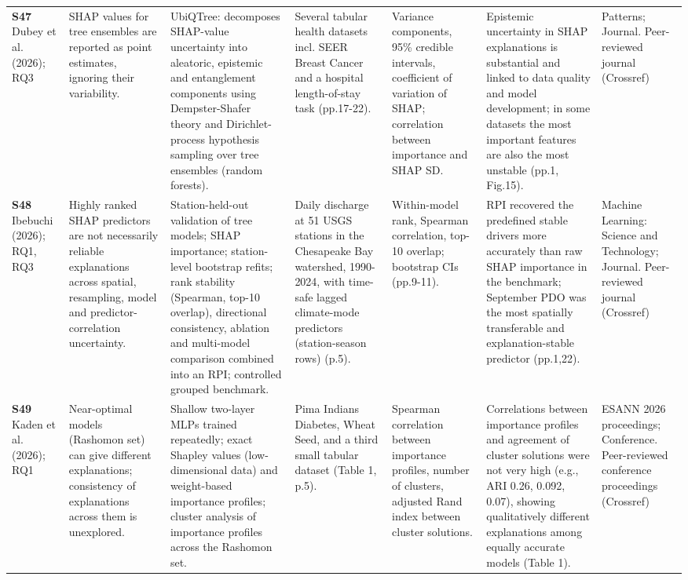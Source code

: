 \begin{longtable}{@{}P{1.55cm}P{2.9cm}P{4.5cm}P{3.2cm}P{3.4cm}P{4.6cm}P{3.6cm}@{}}
\textbf{S47} \cite{S47} Dubey et al. (2026); RQ3 & SHAP values for tree ensembles are reported as point estimates, ignoring their variability. & UbiQTree: decomposes SHAP-value uncertainty into aleatoric, epistemic and entanglement components using Dempster-Shafer theory and Dirichlet-process hypothesis sampling over tree ensembles (random forests). & Several tabular health datasets incl. SEER Breast Cancer and a hospital length-of-stay task (pp.17-22). & Variance components, 95\% credible intervals, coefficient of variation of SHAP; correlation between importance and SHAP SD. & Epistemic uncertainty in SHAP explanations is substantial and linked to data quality and model development; in some datasets the most important features are also the most unstable (pp.1, Fig.15). & Patterns; Journal. Peer-reviewed journal (Crossref) \\
\textbf{S48} \cite{S48} Ibebuchi (2026); RQ1, RQ3 & Highly ranked SHAP predictors are not necessarily reliable explanations across spatial, resampling, model and predictor-correlation uncertainty. & Station-held-out validation of tree models; SHAP importance; station-level bootstrap refits; rank stability (Spearman, top-10 overlap), directional consistency, ablation and multi-model comparison combined into an RPI; controlled grouped benchmark. & Daily discharge at 51 USGS stations in the Chesapeake Bay watershed, 1990-2024, with time-safe lagged climate-mode predictors (station-season rows) (p.5). & Within-model rank, Spearman correlation, top-10 overlap; bootstrap CIs (pp.9-11). & RPI recovered the predefined stable drivers more accurately than raw SHAP importance in the benchmark; September PDO was the most spatially transferable and explanation-stable predictor (pp.1,22). & Machine Learning: Science and Technology; Journal. Peer-reviewed journal (Crossref) \\
\textbf{S49} \cite{S49} Kaden et al. (2026); RQ1 & Near-optimal models (Rashomon set) can give different explanations; consistency of explanations across them is unexplored. & Shallow two-layer MLPs trained repeatedly; exact Shapley values (low-dimensional data) and weight-based importance profiles; cluster analysis of importance profiles across the Rashomon set. & Pima Indians Diabetes, Wheat Seed, and a third small tabular dataset (Table 1, p.5). & Spearman correlation between importance profiles, number of clusters, adjusted Rand index between cluster solutions. & Correlations between importance profiles and agreement of cluster solutions were not very high (e.g., ARI 0.26, 0.092, 0.07), showing qualitatively different explanations among equally accurate models (Table 1). & ESANN 2026 proceedings; Conference. Peer-reviewed conference proceedings (Crossref) \\

\end{longtable}
